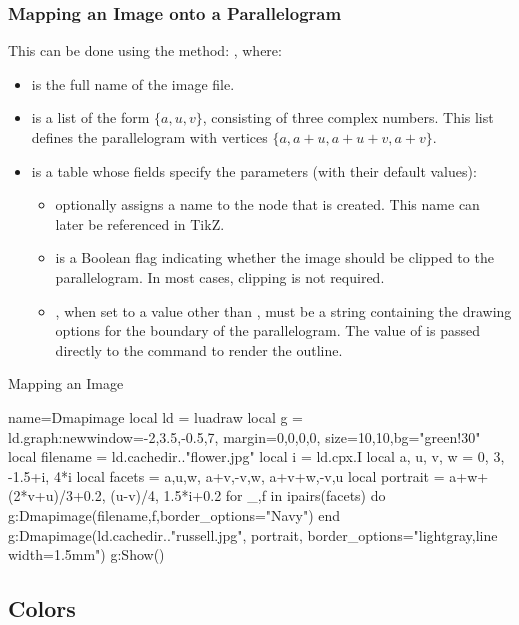 \subsubsection{Mapping an Image onto a Parallelogram}

This can be done using the method: , where:
\begin{itemize}
    \item {} is the full name of the image file.
    \item {} is a list of the form $\{a,u,v\}$, consisting of three complex numbers. This list defines the parallelogram with vertices $\{a,a+u,a+u+v,a+v\}$.
    \item {} is a table whose fields specify the parameters (with their default values):
    \begin{itemize}
        \item {} optionally assigns a name to the node that is created. This name can later be referenced in TikZ.
        \item {} is a Boolean flag indicating whether the image should be clipped to the parallelogram. In most cases, clipping is not required.
        \item {}, when set to a value other than \nil, must be a string containing the drawing options for the boundary of the parallelogram. The value of  is passed directly to the \drawcmd command to render the outline.
    \end{itemize}
\end{itemize}

\begin{demo}{Mapping an Image}
\begin{luadraw}{name=Dmapimage}
local ld = luadraw
local g = ld.graph:new{window={-2,3.5,-0.5,7}, margin={0,0,0,0}, size={10,10},bg="green!30"}
local filename = ld.cachedir.."flower.jpg"
local i = ld.cpx.I
local a, u, v, w = 0, 3, -1.5+i, 4*i
local facets = {{a,u,w}, {a+v,-v,w}, {a+v+w,-v,u} }
local portrait = {a+w+(2*v+u)/3+0.2, (u-v)/4, 1.5*i+0.2}
for _,f in ipairs(facets) do
    g:Dmapimage(filename,f,{border_options="Navy"})
end
g:Dmapimage(ld.cachedir.."russell.jpg", portrait, {border_options="lightgray,line width=1.5mm"})
g:Show()
\end{luadraw}
\end{demo}


\subsection{Colors}

